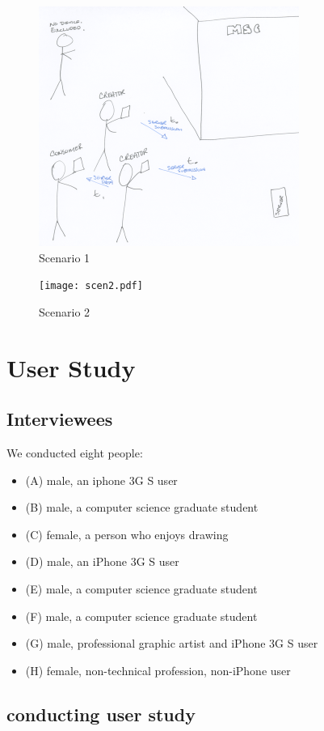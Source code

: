 \documentclass{chi2009}
\begin{document}
\begin{figure}
\centering
\includegraphics[width=.50\textwidth]{scen1.pdf}
\caption{Scenario 1} \label{fig:s1}
\end{figure}

\begin{figure}
\centering
\texttt{[image: scen2.pdf]}
\caption{Scenario 2} \label{fig:s2}
\end{figure}



\section{User Study}
\subsection{Interviewees}
We conducted eight people:

\begin{itemize}
\item (A) male, an iphone 3G S user
\item (B) male, a computer science graduate student
\item (C) female, a person who enjoys drawing
\item (D) male, an iPhone 3G S user
\item (E) male, a computer science graduate student
\item (F) male, a computer science graduate student
\item (G) male, professional graphic artist and iPhone 3G S user
\item (H) female, non-technical profession, non-iPhone user
\end{itemize}

\subsection{conducting user study}
\end{document}
